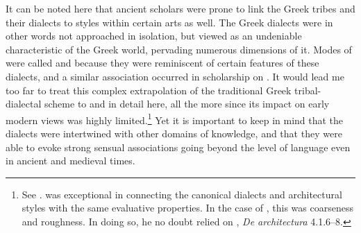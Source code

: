 \begin{longtable}{>{\raggedright\arraybackslash\hangindent=.5em}p{3cm}>{\raggedright\arraybackslash}p{\textwidth - 3\tabcolsep - 3cm}}
\end{longtable}

\pagebreak
It can be noted here that ancient scholars were prone to link the Greek tribes and their dialects to styles within certain arts as well. The Greek dialects were in other words not approached in isolation, but viewed as an undeniable characteristic of the Greek world, pervading numerous dimensions of it. Modes of  were called  and  because they were reminiscent of certain features of these dialects, and a similar association occurred in scholarship on . It would lead me too far to treat this complex extrapolation of the traditional Greek tribal-dialectal scheme to  and  in detail here, all the more since its impact on early modern views was highly limited.\footnote{See \citet{Cassio1984}. \citet[118]{Mazzocchi1754} was exceptional in connecting the canonical dialects and architectural styles with the same evaluative properties. In the case of , this was coarseness and roughness. In doing so, he no doubt relied on , \textit{De architectura} 4.1.6–8.} Yet it is important to keep in mind that the dialects were intertwined with other domains of knowledge, and that they were able to evoke strong sensual associations going beyond the level of language even in ancient and medieval times.\largerpage[-1]


